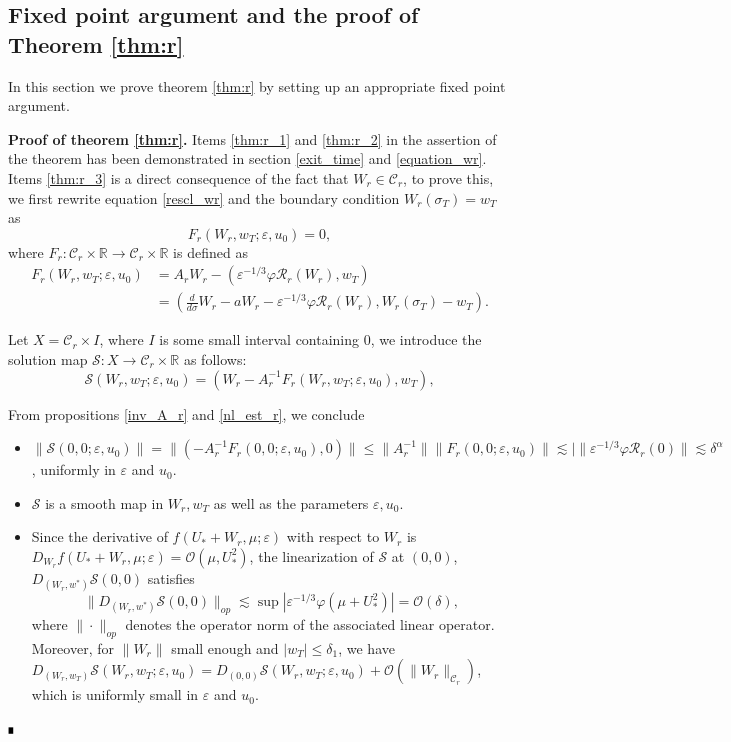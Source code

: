 \documentclass[letterpaper,11pt]{article}
\newcommand{\Ral}{\mathcal{R}}
\newcommand{\rmO}{\mathcal{O}}
\newcommand{\eps}{\varepsilon}
\newcommand{\lar}{ \lesssim }
\numberwithin{equation}{section}
\theoremstyle{plain}
\newenvironment{Proof}[1][.]%
 {\begin{trivlist}\item[]\textbf{Proof#1 }}%
 {\hspace*{\fill}$\rule{0.3\baselineskip}{0.35\baselineskip}$\end{trivlist}}
\begin{document}
\subsection{Fixed point argument and the proof of Theorem \ref{thm:r}}
In this section we prove theorem \ref{thm:r} by setting up an appropriate fixed point argument.
\begin{Proof}[ of theorem \ref{thm:r}.]
Items \ref{thm:r_1} and \ref{thm:r_2} in the assertion of the theorem has been demonstrated in section \ref{exit_time} and \ref{equation_wr}. Items \ref{thm:r_3} is a direct consequence of the fact that $W_r \in \mathcal{C}_r$, to prove this, we first rewrite equation \eqref{rescl_wr} and the boundary condition $W_r(\sigma_T)=w_T$ as 
\[
F_r(W_r, w_T; \eps, u_0) = 0,
\]
where $F_r : \mathcal{C}_r\times \mathbb{R} \to \mathcal{C}_r\times \mathbb{R}$ is defined as
\begin{align*}
F_r(W_r,w_T;\eps,u_0) &= A_rW_r - \left(\eps^{-1/3}\varphi \Ral_r(W_r), w_T \right)\\
&=\left( \frac{d}{d\sigma}W_r-aW_r - \eps^{-1/3}\varphi \Ral_r(W_r), W_r(\sigma_T)-w_T \right).
\end{align*} 


Let $X = \mathcal{C}_r \times I$, where $I$ is some small interval containing $0$, we introduce the solution map $\mathcal{S}: X \to \mathcal{C}_r\times \mathbb{R}$ as follows:
\[
\mathcal{S}(W_r,w_T; \eps, u_0) = (W_r-A_r^{-1}F_r(W_r,w_T;\eps, u_0), w_T),
\]

From propositions \ref{inv_A_r} and \ref{nl_est_r}, we conclude 
\begin{itemize}
\item $\|\mathcal{S}(0,0;\eps,u_0) \|= \|\left( -A_r^{-1}F_r(0,0;\eps,u_0),0\right)\| \le \|A_r^{-1}\|\|F_r(0,0;\eps,u_0)\| \lar |\|\eps^{-1/3}\varphi \Ral_r(0)\| \lar \delta^\alpha$, uniformly in $\eps$ and $u_0$.

\item $\mathcal{S}$ is a smooth map in $W_r,w_T$ as well as the parameters $\eps, u_0$.

\item Since the derivative of $f(U_*+W_r,\mu;\eps)$ with respect to $W_r$ is $D_{W_r} f(U_*+W_r,\mu;\eps)=\rmO(\mu, U_*^2)$, the linearization of $\mathcal{S}$ at $(0,0)$, $D_{(W_r,w^*)} \mathcal{S}(0,0)$ satisfies
\[
\|D_{(W_r,w^*)} \mathcal{S}(0,0)\|_{op} \lar \sup|\eps^{-1/3}\varphi(\mu+U_*^2)| = \rmO(\delta),
\]
where $\|\cdot\|_{op}$ denotes the operator norm of the associated linear operator.
Moreover, for $\|W_r\|$ small enough and $|w_T|\le \delta_1$, we have $D_{(W_r,w_T)}\mathcal{S}(W_r,w_T;\eps,u_0) =  D_{(0,0)}\mathcal{S}(W_r,w_T;\eps,u_0)+\rmO(\|W_r\|_{\mathcal{C}_r})$, which is uniformly small in $\eps$ and $u_0$.


\end{itemize}
\end{Proof}
\end{document}

